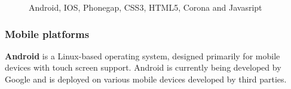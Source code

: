 \begin{figure}[!ht]
{}
\caption{Android, IOS, Phonegap, CSS3, HTML5, Corona and Javasript}
\end{figure}

\subsubsection{Mobile platforms}
{\bf Android} is a Linux-based operating system, designed primarily for mobile
devices with touch screen support. Android is currently being developed by
Google and is deployed on various mobile devices developed by third parties.
\linebreak

